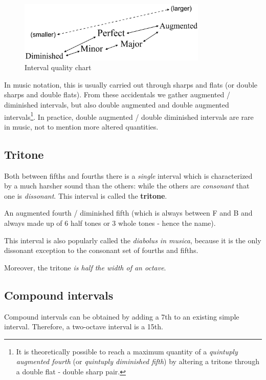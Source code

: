 \begin{figure}
    \begin{center}
        \includegraphics[width=0.8\textwidth]{img/quality}
        \caption{Interval quality chart}
    \end{center}
\end{figure}

In music notation, this is usually carried out through sharps and flats (or double sharps and double flats). From these accidentals we gather augmented / diminished intervals, but also double augmented and double augmented intervals\footnote{It is theoretically possible to reach a maximum quantity of a \emph{quintuply augmented fourth} (or \emph{quintuply diminished fifth}) by altering a tritone through a double flat - double sharp pair.}. In practice,  double augmented / double diminished intervals are rare in music, not to mention more altered quantities.

\subsection{Tritone}
Both between fifths and fourths there is a \emph{single} interval which is characterized by a much harsher sound than the others: while the others are \emph{consonant} that one is \emph{dissonant}. This interval is called the \textbf{tritone}.

\begin{definition}[Tritone]
    An augmented fourth / diminished fifth (which is always between F and B and always made up of 6 half tones or 3 whole tones - hence the name).
\end{definition}

This interval is also popularly called the \emph{diabolus in musica}, because it is the only dissonant exception to the consonant set of fourths and fifths.

Moreover, the tritone \emph{is half the width of an octave}.

\subsection{Compound intervals}
Compound intervals can be obtained by adding a 7th to an existing simple interval. Therefore, a two-octave interval is a 15th.

